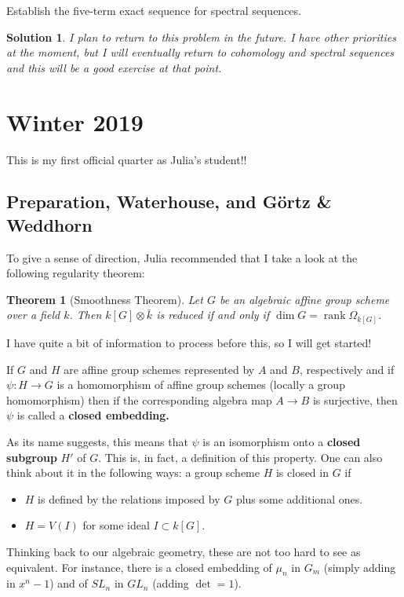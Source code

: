 \documentclass[12pt]{article}
\theoremstyle{nonumberbreak}
\newtheorem{sol}{Solution}
\theoremstyle{changebreak}
\newtheorem{thm}{Theorem}[subsection]
\theoremstyle{nonumberbreak}
\DeclareMathOperator{\rank}{rank}
\begin{document}
\begin{prob}
	Establish the five-term exact sequence for spectral sequences.
\end{prob}
\begin{sol}
	I plan to return to this problem in the future. I have other priorities at the moment,
	but I will eventually return to cohomology and spectral sequences and this will be a good
	exercise at that point.
\end{sol}

\section{Winter 2019}
This is my first official quarter as Julia's student!! 
\subsection{Preparation, Waterhouse, and G\"ortz \& Weddhorn}
To give a sense of direction, Julia recommended that I take a look at the following regularity theorem:
\begin{thm}[Smoothness Theorem]\label{smooth}
	Let $G$ be an algebraic affine group scheme over a field $k$. Then $k[G]\otimes \bar k$ is reduced if and
	only if $\dim G = \rank \Omega_{k[G]}$.
\end{thm}
I have quite a bit of information to process before this, so I will get started!
\begin{defn}
	If $G$ and $H$ are affine group schemes represented by $A$ and $B$, respectively and
	if $\psi:H\to G$ is a homomorphism of affine group schemes (locally a group homomorphism)
	then if the corresponding algebra map $A\to B$ is surjective, then $\psi$ is called
	a \textbf{closed embedding.}
\end{defn}

As its name suggests, this means that $\psi$ is an isomorphism onto a \textbf{closed subgroup}
$H'$ of $G$. This is, in fact, a definition of this property. One can also think about 
it in the following ways: a group scheme $H$ is closed in $G$ if
\begin{itemize}
	\item $H$ is defined by the relations imposed by $G$ plus some additional ones.
	\item $H=V(I)$ for some ideal $I\subset k[G]$. 
\end{itemize}
Thinking back to our algebraic geometry, these are not too hard to see as equivalent. 
For instance, there is a closed embedding of $\mu_n$ in $G_m$ (simply adding in $x^n-1$)
and of $SL_n$ in $GL_n$ (adding $\det = 1$).
\end{document}
